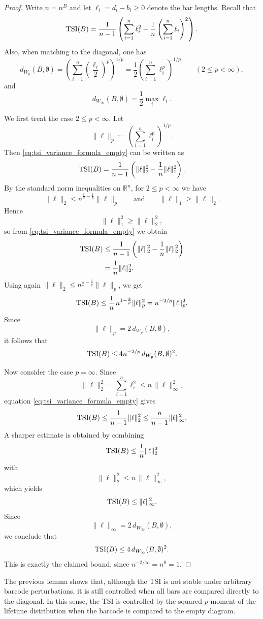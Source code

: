 \documentclass[11pt]{amsart}
\theoremstyle{definition}
\newcommand{\tsi}[0]{\textup{TSI}}
\begin{document}
\begin{proof}
Write $n=n^B$ and let $\ell_i=d_i-b_i\ge 0$ denote the bar lengths. Recall that
\begin{equation}\label{eq:tsi_variance_formula_empty}
\tsi(B)=\frac{1}{n-1}\left(\sum_{i=1}^n \ell_i^2-\frac{1}{n}\left(\sum_{i=1}^n \ell_i\right)^2\right).
\end{equation}
Also, when matching to the diagonal, one has
\[
d_{W_p}(B,\emptyset)
=
\left(\sum_{i=1}^n \left(\frac{\ell_i}{2}\right)^p\right)^{1/p}
=
\frac12\left(\sum_{i=1}^n \ell_i^p\right)^{1/p}
\qquad (2\le p<\infty),
\]
and
\[
d_{W_\infty}(B,\emptyset)=\frac12\max_i \ell_i.
\]

We first treat the case $2\le p<\infty$. Let
\[
\|\ell\|_p:=\left(\sum_{i=1}^n \ell_i^p\right)^{1/p}.
\]
Then \eqref{eq:tsi_variance_formula_empty} can be written as
\[
\tsi(B)=\frac{1}{n-1}\left(\|\ell\|_2^2-\frac{1}{n}\|\ell\|_1^2\right).
\]
By the standard norm inequalities on $\mathbb{R}^n$, for $2\le p<\infty$ we have
\[
\|\ell\|_2 \le n^{\frac12-\frac1p}\|\ell\|_p
\qquad\text{and}\qquad
\|\ell\|_1 \ge \|\ell\|_2.
\]
Hence
\[
\|\ell\|_1^2 \ge \|\ell\|_2^2,
\]
so from \eqref{eq:tsi_variance_formula_empty} we obtain
\begin{align*}
\tsi(B)
&\le \frac{1}{n-1}\left(\|\ell\|_2^2-\frac{1}{n}\|\ell\|_2^2\right)\\
&=\frac{1}{n}\|\ell\|_2^2.
\end{align*}
Using again $\|\ell\|_2 \le n^{\frac12-\frac1p}\|\ell\|_p$, we get
\[
\tsi(B)\le \frac{1}{n}\, n^{1-\frac{2}{p}}\|\ell\|_p^2
= n^{-2/p}\|\ell\|_p^2.
\]
Since
\[
\|\ell\|_p = 2\, d_{W_p}(B,\emptyset),
\]
it follows that
\[
\tsi(B)\le 4 n^{-2/p}\, d_{W_p}(B,\emptyset)^2.
\]

Now consider the case $p=\infty$. Since
\[
\|\ell\|_2^2=\sum_{i=1}^n \ell_i^2 \le n\,\|\ell\|_\infty^2,
\]
equation \eqref{eq:tsi_variance_formula_empty} gives
\[
\tsi(B)\le \frac{1}{n-1}\|\ell\|_2^2 \le \frac{n}{n-1}\|\ell\|_\infty^2.
\]
A sharper estimate is obtained by combining
\[
\tsi(B)\le \frac{1}{n}\|\ell\|_2^2
\]
with
\[
\|\ell\|_2^2\le n\,\|\ell\|_\infty^2,
\]
which yields
\[
\tsi(B)\le \|\ell\|_\infty^2.
\]
Since
\[
\|\ell\|_\infty = 2\, d_{W_\infty}(B,\emptyset),
\]
we conclude that
\[
\tsi(B)\le 4\, d_{W_\infty}(B,\emptyset)^2.
\]
This is exactly the claimed bound, since $n^{-2/\infty}=n^0=1$.
\end{proof}


The previous lemma shows that, although the TSI is not stable under arbitrary barcode perturbations, it is still controlled when all bars are compared directly to the diagonal. In this sense, the TSI is controlled by the squared $p$-moment of the lifetime distribution when the barcode is compared to the empty diagram.
\end{document}
